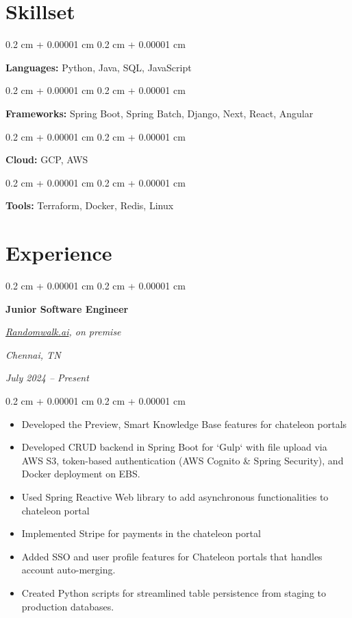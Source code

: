 \documentclass[10pt, letterpaper]{article}
\newenvironment{highlights}{
    \begin{itemize}[
        topsep=0.10 cm,
        parsep=0.10 cm,
        partopsep=0pt,
        itemsep=0pt,
        leftmargin=0.4 cm + 10pt
    ]
}{
    \end{itemize}
} %
\newenvironment{onecolentry}{
    \begin{adjustwidth}{
        0.2 cm + 0.00001 cm
    }{
        0.2 cm + 0.00001 cm
    }
}{
    \end{adjustwidth}
} %
\newenvironment{twocolentry}[2][]{
    \onecolentry
    \def\secondColumn{#2}
    \setcolumnwidth{\fill, 4.5 cm}
    \begin{paracol}{2}
}{
    \switchcolumn \raggedleft \secondColumn
    \end{paracol}
    \endonecolentry
} %
\let\hrefWithoutArrow\href
\renewcommand{\href}[2]{\hrefWithoutArrow{#1}{\ifthenelse{\equal{#2}{}}{ }{#2 }\raisebox{.15ex}{\footnotesize \faExternalLink*}}}
\begin{document}
\section{Skillset}

\begin{onecolentry}
    \textbf{Languages:} Python, Java, SQL, JavaScript
\end{onecolentry}
\vspace{0.10 cm}

\begin{onecolentry}
    \textbf{Frameworks:} Spring Boot, Spring Batch, Django, Next, React, Angular
\end{onecolentry}
\vspace{0.10 cm}

\begin{onecolentry}
    \textbf{Cloud:} GCP, AWS
\end{onecolentry}
\vspace{0.10 cm}

\begin{onecolentry}
    \textbf{Tools:} Terraform, Docker, Redis, Linux
\end{onecolentry}
\vspace{0.10 cm}

\section{Experience}

\begin{twocolentry}{
        \textit{Chennai, TN}

        \textit{July 2024 – Present}}
    \textbf{Junior Software Engineer}

    \textit{{\hrefWithoutArrow{https://randomwalk.ai/}{\color{black}\hspace*{0.13cm}Randomwalk.ai}}, on premise}
\end{twocolentry}

\vspace{0.10 cm}
\begin{onecolentry}
    \begin{highlights}
        \item Developed the Preview, Smart Knowledge Base features for chateleon portals
        \item Developed CRUD backend in Spring Boot for `Gulp` with file upload via AWS S3,
        token-based authentication (AWS Cognito \& Spring Security), and Docker
        deployment on EBS.
        \item Used Spring Reactive Web library to add asynchronous functionalities to
        chateleon portal
        \item Implemented Stripe for payments in the chateleon portal
        \item Added SSO and user profile features for Chateleon portals that handles account
        auto-merging.
        \item Created Python scripts for streamlined table persistence from staging to
        production databases.
    \end{highlights}
\end{onecolentry}
\end{document}
